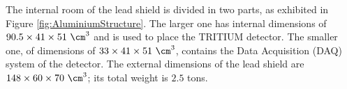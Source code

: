 The internal room of the lead shield is divided in two parts, as exhibited in Figure \ref{fig:AluminiumStructure}. The larger one has internal dimensions of $90.5 \times 41 \times 51~\cm^3$ and is used to place the TRITIUM detector. The smaller one, of dimensions of $33 \times 41 \times 51~\cm^3$, contains the Data Acquisition (DAQ) system of the detector. The external dimensions of the lead shield are $148 \times 60 \times 70~\cm^3$; its total weight is $2.5$ tons.